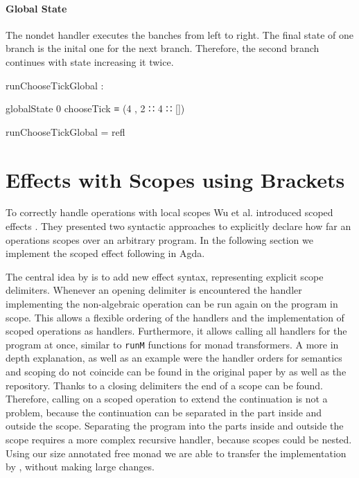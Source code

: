 \paragraph{Global State}
The nondet handler executes the banches from left to right.
The final state of one branch is the inital one for the next branch.
Therefore, the second branch continues with state  increasing it
twice.

\begin{center}
\begin{code}
runChooseTickGlobal :
\end{code}
\begin{code}[inline]
 globalState 0 chooseTick ≡ (4 , 2 ∷ 4 ∷ [])
\end{code}
\begin{code}
runChooseTickGlobal = refl
\end{code}
\end{center}


\section{Effects with Scopes using Brackets}
\label{fist-order:scoped-effects}

To correctly handle operations with local scopes Wu et al. introduced scoped
effects \cite{DBLP:conf/haskell/WuSH14}.
They presented two syntactic approaches to explicitly declare how far an
operations scopes over an arbitrary program.
In the following section we implement the scoped effect
 following \textcite{DBLP:conf/haskell/WuSH14} in Agda.

The central idea by \textcite{DBLP:conf/haskell/WuSH14} is to add new effect
syntax, representing explicit scope delimiters.
Whenever an opening delimiter is encountered the handler implementing the
non-algebraic operation can be run again on the program in scope.
This allows a flexible ordering of the handlers and the implementation of scoped
operations as handlers. 
Furthermore, it allows calling all handlers for the program at once, similar to
\texttt{runM} functions for monad transformers.
A more in depth explanation, as well as an example were the handler orders for
semantics and scoping do not coincide can be found in the original paper by
\textcite{DBLP:conf/haskell/WuSH14} as well as the repository.
Thanks to a closing delimiters the end of a scope can be found.
Therefore, calling \AgdaFunction{>>=} on a scoped operation to extend the
continuation is not a problem, because the continuation can be separated in the
part inside and outside the scope.
Separating the program into the parts inside and outside the scope requires a
more complex recursive handler, because scopes could be nested. 
Using our size annotated free monad we are able to transfer the implementation
by \textcite{DBLP:conf/haskell/WuSH14}, without making large changes.


